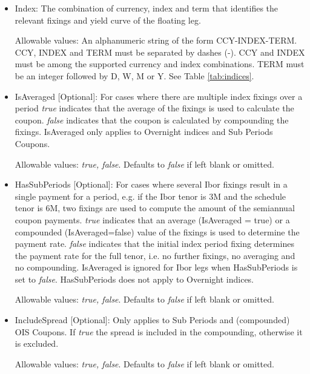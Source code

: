 \begin{itemize}
\item Index:  The combination of currency, index and term that
  identifies the relevant fixings and yield curve of the floating leg.  

  Allowable values: An alphanumeric string of the form CCY-INDEX-TERM. CCY, INDEX and TERM must be separated by dashes (-). CCY and INDEX must be among the supported currency and index combinations. TERM must be an integer followed by D, W,
  M or Y. See Table \ref{tab:indices}.

\item IsAveraged [Optional]:  For cases where there are multiple index fixings over a period \emph{true} indicates that
  the average of the fixings is used to calculate the coupon.  \emph{false} indicates that the coupon is calculated by
  compounding the fixings.  IsAveraged only applies to Overnight indices and Sub Periods Coupons.

Allowable values:  \emph{true, false}. Defaults to \emph{false} if left blank or omitted.

\item HasSubPeriods [Optional]: For cases where several Ibor fixings result in a single payment for a period, e.g. if
  the Ibor tenor is 3M and the schedule tenor is 6M, two fixings are used to compute the amount of the semiannual coupon
  payments. \emph{true} indicates that an average (IsAveraged = true) or a compounded (IsAveraged=false) value of the
  fixings is used to determine the payment rate.  \emph{false} indicates that the initial index period fixing determines the payment rate for the 
  full tenor, i.e. no further fixings, no averaging and no compounding. IsAveraged is ignored for Ibor legs when HasSubPeriods is set to  \emph{false}.
  HasSubPeriods does not apply to Overnight indices. 

Allowable values:  \emph{true, false}. Defaults to \emph{false} if left blank or omitted.

\item IncludeSpread [Optional]: Only applies to Sub Periods and (compounded) OIS Coupons. If \emph{true} the spread is
  included in the compounding, otherwise it is excluded.

Allowable values:  \emph{true, false}. Defaults to \emph{false} if left blank or omitted.


\end{itemize}
